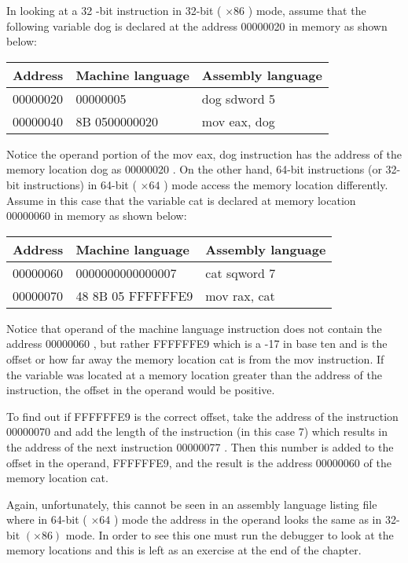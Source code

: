 \documentclass[10pt]{article}
\begin{document}
In looking at a 32 -bit instruction in 32-bit ( $\times 86$ ) mode, assume that the following variable dog is declared at the address 00000020 in memory as shown below:

\begin{center}
\begin{tabular}{|l|l|l|}
\hline
Address & Machine language & Assembly language \\
\hline
00000020 & 00000005 & dog sdword 5 \\
\hline
00000040 & 8B 0500000020 & mov eax, dog \\
\hline
\end{tabular}
\end{center}

Notice the operand portion of the mov eax, dog instruction has the address of the memory location dog as 00000020 . On the other hand, 64-bit instructions (or 32-bit instructions) in 64-bit ( $\times 64$ ) mode access the memory location differently. Assume in this case that the variable cat is declared at memory location 00000060 in memory as shown below:

\begin{center}
\begin{tabular}{|l|l|l|}
\hline
Address & Machine language & Assembly language \\
\hline
00000060 & 0000000000000007 & cat sqword 7 \\
\hline
00000070 & 48 8B 05 FFFFFFE9 & mov rax, cat \\
\hline
\end{tabular}
\end{center}

Notice that operand of the machine language instruction does not contain the address 00000060 , but rather FFFFFFE9 which is a -17 in base ten and is the offset or how far away the memory location cat is from the mov instruction. If the variable was located at a memory location greater than the address of the instruction, the offset in the operand would be positive.

To find out if FFFFFFE9 is the correct offset, take the address of the instruction 00000070 and add the length of the instruction (in this case 7) which results in the address of the next instruction 00000077 . Then this number is added to the offset in the operand, FFFFFFE9, and the result is the address 00000060 of the memory location cat.

Again, unfortunately, this cannot be seen in an assembly language listing file where in 64-bit ( $\times 64$ ) mode the address in the operand looks the same as in 32-bit $(\times 86)$ mode. In order to see this one must run the debugger to look at the memory locations and this is left as an exercise at the end of the chapter.
\end{document}
